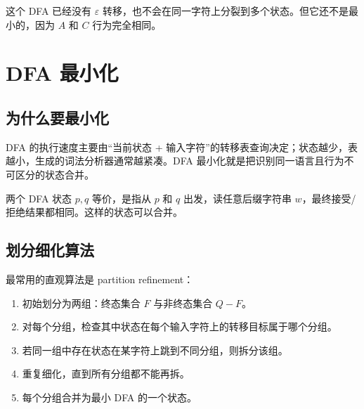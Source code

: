 \documentclass[UTF8,fontset=none,11pt]{ctexart}
\newenvironment{defbox}[1][]{%
  \par\medskip\noindent{\color{defrule}\rule{\linewidth}{1.1pt}}\par\nopagebreak
  \noindent{\bfseries\color{defrule}#1}\par\nopagebreak\smallskip}%
  {\par\nopagebreak\smallskip\noindent{\color{defrule}\rule{\linewidth}{0.4pt}}\par\medskip}
\newcommand{\eps}{\varepsilon}
\begin{document}
这个 DFA 已经没有 \(\eps\) 转移，也不会在同一字符上分裂到多个状态。但它还不是最小的，因为 \(A\) 和 \(C\) 行为完全相同。

\section{DFA 最小化}

\subsection{为什么要最小化}

DFA 的执行速度主要由“当前状态 + 输入字符”的转移表查询决定；状态越少，表越小，生成的词法分析器通常越紧凑。DFA 最小化就是把识别同一语言且行为不可区分的状态合并。

\begin{defbox}[等价状态]
两个 DFA 状态 \(p,q\) 等价，是指从 \(p\) 和 \(q\) 出发，读任意后缀字符串 \(w\)，最终接受/拒绝结果都相同。这样的状态可以合并。
\end{defbox}

\subsection{划分细化算法}

最常用的直观算法是 partition refinement：

\begin{enumerate}
  \item 初始划分为两组：终态集合 \(F\) 与非终态集合 \(Q-F\)。
  \item 对每个分组，检查其中状态在每个输入字符上的转移目标属于哪个分组。
  \item 若同一组中存在状态在某字符上跳到不同分组，则拆分该组。
  \item 重复细化，直到所有分组都不能再拆。
  \item 每个分组合并为最小 DFA 的一个状态。
\end{enumerate}

\begin{center}
\end{center}
\end{document}
